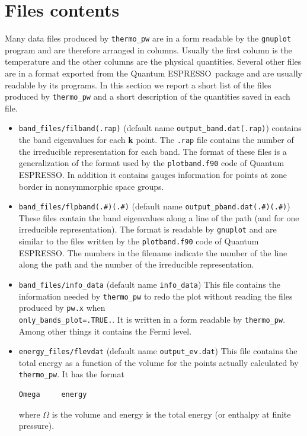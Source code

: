 \documentclass[12pt,a4paper]{article}
\def\qe{{\sc Quantum ESPRESSO}}
\begin{document}
\newpage
\section{\color{coral}Files contents}

Many data files produced by \texttt{thermo\_pw} are in a form readable
by the \texttt{gnuplot} program and are therefore arranged in columns.
Usually the first column is the temperature and the other columns are
the physical quantities. Several other files are in a format exported
from the \qe\ package and are usually readable by its 
programs. In this section we report a short list of the files produced
by \texttt{thermo\_pw} and a short description of the quantities 
saved in each file. 

\begin{itemize}

\item 
\texttt{band\_files/filband(.rap)} (default name 
\texttt{output\_band.dat(.rap)}) contains the band eigenvalues for each 
{\bf k} point. The \texttt{.rap} file contains the number of the irreducible
representation for each band. The format of these files is a generalization
of the format used by the \texttt{plotband.f90} code of \qe. In addition
it contains gauges information for points at zone border in nonsymmorphic
space groups.

\item 
\texttt{band\_files/flpband(.\#)(.\#)} 
(default name \texttt{output\_pband.dat(.\#)(.\#)})
These files contain the band eigenvalues along a line of the path 
(and for one irreducible representation). 
The format is readable by \texttt{gnuplot} and are similar to the files written
by the \texttt{plotband.f90} code of \qe. The numbers in
the filename indicate the number of the line along the path and the number 
of the irreducible representation.

\item 
\texttt{band\_files/info\_data} (default name \texttt{info\_data}) This
file contains the information needed by \texttt{thermo\_pw}
to redo the plot without reading the files produced by \texttt{pw.x}
when\\ \texttt{only\_bands\_plot=.TRUE.}. It is written
in a form readable by \texttt{thermo\_pw}. Among other things it
contains the Fermi level.

\item 
\texttt{energy\_files/flevdat} (default name \texttt{output\_ev.dat})
This file contains the total energy as a function of the volume for the
points actually calculated by \texttt{thermo\_pw}. It has the format
\begin{verbatim}
Omega     energy
\end{verbatim}
where $\Omega$ is the volume and energy is the total energy (or enthalpy at
finite pressure).


\end{itemize}
\end{document}
